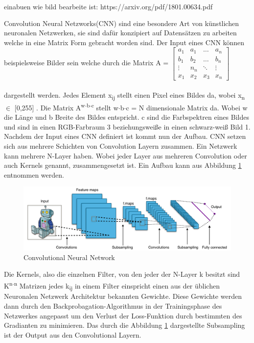 \documentclass{llncs}
\begin{document}
einabuen wie bild bearbeite ist:
https://arxiv.org/pdf/1801.00634.pdf

Convolution Neural Netzworks(CNN) sind eine besondere Art von künstlichen neuronalen Netzwerken, sie sind dafür konzipiert auf Datensätzen zu arbeiten welche in eine Matrix Form gebracht worden sind. Der Input eines CNN können beispielsweise Bilder sein welche durch die Matrix A =
$
\begin{bmatrix}
a_1	& a_1	& \dots	 & a_n     \\
b_1	& b_2 	& \dots  & b_n	  \\
\vdots	& n_n 	& \ddots & \vdots \\
x_1 	& x_2 & x_3	 & x_n
\end{bmatrix}
$
\\\\dargestellt werden. Jedes Element x\textsubscript{ij} stellt einen Pixel eines Bildes da, wobei x\textsubscript{n} $\in$ [0,255] . Die Matrix A\textsuperscript{w$\cdot$b$\cdot$c} stellt w$\cdot$b$\cdot$c = N dimensionale Matrix da. Wobei w die Länge und b Breite des Bildes entspricht. c sind die Farbspektren eines Bildes und sind in einen RGB-Farbraum 3 beziehungsweiße in einen schwarz-weiß Bild 1. Nachdem  der Input eines CNN definiert ist kommt nun der Aufbau. CNN setzen sich aus mehrere Schichten von Convolution Layern zusammen. Ein Netzwerk kann mehrere N-Layer haben. Wobei jeder Layer aus mehreren Convolution oder auch Kernels genannt, zusammengesetzt ist. Ein Aufbau kann aus Abbildung \ref{fig:Bild2} entnommen werden\cite{Grundlagen}.

\begin{figure}[htbp] 
	\centering
	\includegraphics[width=1.0\textwidth]{convol.png}
	\caption{Convolutional Neural Network}
	\label{fig:Bild2}
\end{figure}

Die Kernels, also die einzelnen Filter, von den jeder der N-Layer k besitzt sind K\textsuperscript{n$\cdot$n} Matrizen jedes k\textsubscript{ij} in einem Filter einspricht einen aus der üblichen Neuronalen Netzwerk Architektur bekannten Gewichte. Diese Gewichte werden dann durch den Backprobagation-Algorithmus in der Trainingsphase des Netzwerkes angepasst um den Verlust der Loss-Funktion durch bestimmten des Gradianten zu minimieren. Das durch die Abbildung \ref{fig:Bild2} dargestellte Subsampling ist der Output aus den Convolutional Layern\cite{Grundlagen}. 
\end{document}
